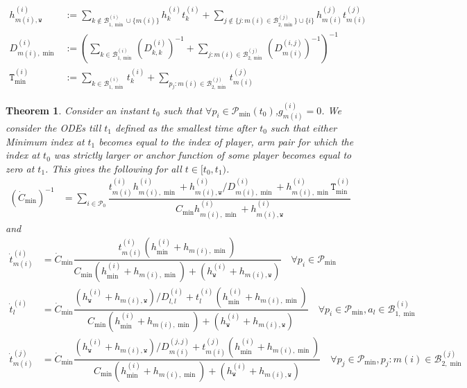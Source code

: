 \documentclass{article}
\newtheorem{theorem}{Theorem}
\begin{document}
\begin{align*}
h^{(i)}_{m(i),\texttt{w}} &:= \sum_{k\not\in\mathcal{B}^{(i)}_{1,\min}\cup\{m(i)\}}h^{(i)}_{k}t^{(i)}_k + \sum_{j\not\in\{j:m(i)\in\mathcal{B}^{(j)}_{2,\min}\}\cup\{i\}}h^{(j)}_{m(i)}t^{(j)}_{m(i)} \\
    D^{(i)}_{m(i),\min} &:= \left(\sum_{k\in\mathcal{B}^{(i)}_{1,\min}}\left(D^{(i)}_{k,k}\right)^{-1}+\sum_{j:m(i)\in\mathcal{B}^{(j)}_{2,\min}}\left(D^{(i,j)}_{m(i)}\right)^{-1}\right)^{-1} \\ \texttt{T}^{(i)}_{\min} &:= \sum_{k\in \mathcal{B}_{1,\min}^{(i)}}t^{(i)}_k+\sum_{p_j:m(i)\in \mathcal{B}_{2,\min}^{(j)}}t^{(j)}_{m(i)}
\end{align*}
\begin{theorem}
Consider an instant $t_0$ such that $\forall p_i\in\mathcal{P}_{\min}(t_0)$,$g^{(i)}_{m(i)}=0$.
 We consider the ODEs till $t_1$ defined as the smallest time after $t_0$ such that either Minimum index at $t_1$ becomes equal to the index of player, arm pair for which the index at $t_0$ was strictly larger
     or anchor function of some player becomes equal to zero at $t_1$. This gives  the following for all $t\in [t_0,t_1)$.
        \begin{align*}
       (\dot{C}_{\min})^{-1
        }&=  \sum_{i\in\mathcal{P}_{0}} \dfrac{ t^{(i)}_{m(i)}h^{(i)}_{m(i),\min}+h^{(i)}_{m(i),\texttt{w}}/D^{(i)}_{m(i),\min}+h^{(i)}_{m(i),\min}\texttt{T}^{(i)}_{\min}}{ C_{\min}h^{(i)}_{m(i),\min}+h^{(i)}_{m(i),\texttt{w}}} 
\end{align*}
and 
 \begin{align*}
     \dot{t}^{(i)}_{m(i)} &= \dot{C}_{\min}\dfrac{ t^{(i)}_{m(i)}(h^{(i)}_{\min}+h_{m(i),\min})}{ C_{\min}(h^{(i)}_{\min}+h_{m(i),\min})+(h^{(i)}_{\texttt{w}}+h_{m(i),\texttt{w}})}\quad \forall p_i\in\mathcal{P}_{\min}\\
       \dot{t}^{(i)}_{l} &= \dot{C}_{\min}\dfrac{(h^{(i)}_{\texttt{w}}+h_{m(i),\texttt{w}})/D^{(i)}_{l,l}+t^{(i)}_l(h^{(i)}_{\min}+h_{m(i),\min})}{ C_{\min}(h^{(i)}_{\min}+h_{m(i),\min})+(h^{(i)}_{\texttt{w}}+h_{m(i),\texttt{w}})}\quad \forall p_i\in\mathcal{P}_{\min}, a_l\in\mathcal{B}_{1,\min}^{(i)}\\
       \dot{t}^{(j)}_{m(i)} &=   \dot{C}_{\min}\dfrac{(h^{(i)}_{\texttt{w}}+h_{m(i),\texttt{w}})/D^{(j,j)}_{m(i)}+t^{(j)}_{m(i)}(h^{(i)}_{\min}+h_{m(i),\min})}{ C_{\min}(h^{(i)}_{\min}+h_{m(i),\min})+(h^{(i)}_{\texttt{w}}+h_{m(i),\texttt{w}})}\quad \forall p_j\in\mathcal{P}_{\min}, p_j:m(i)\in\mathcal{B}_{2,\min}^{(j)}
   \end{align*}
\end{theorem}
\end{document}
